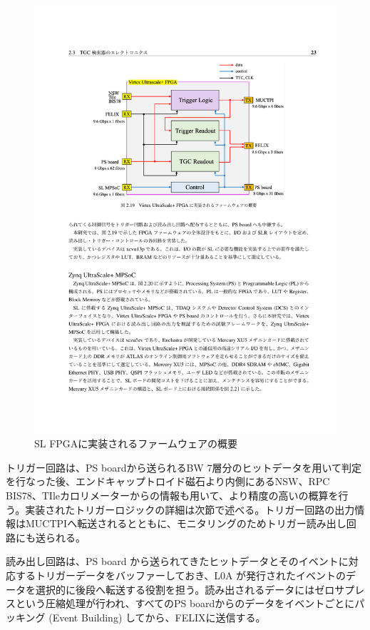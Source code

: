 \begin{figure} 
\centering
\includegraphics[width=16cm]{fig/Intro/SL_FW_overview.pdf}
\caption[SL FPGAに実装されるファームウェアの概要]{SL FPGAに実装されるファームウェアの概要\cite{mt_mishima}}
\label{SL_FW_overview}
\end{figure}

トリガー回路は、PS boardから送られるBW 7層分のヒットデータを用いて\pt 判定を行なった後、エンドキャップトロイド磁石より内側にあるNSW、RPC BIS78、TIleカロリメーターからの情報も用いて、より精度の高い\pt の概算を行う。実装されたトリガーロジックの詳細は次節で述べる。トリガー回路の出力情報はMUCTPIへ転送されるとともに、モニタリングのためトリガー読み出し回路にも送られる。

読み出し回路は、PS board から送られてきたヒットデータとそのイベントに対応するトリガーデータをバッファーしておき、L0A が発行されたイベントのデータを選択的に後段へ転送する役割を担う。読み出されるデータにはゼロサプレスという圧縮処理が行われ、すべてのPS boardからのデータをイベントごとにパッキング  (Event Building) してから、FELIXに送信する。


